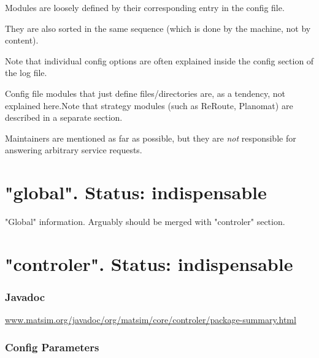 


Modules are loosely defined by their corresponding entry in the config file.

They are also sorted in the same sequence (which is done by the machine, not by content).

Note that individual config options are often explained inside the config section of the log file.

Config file modules that just define files/directories are, as a tendency, not explained here.Note that strategy modules (such as ReRoute, Planomat) are described in a separate section.

Maintainers are mentioned as far as possible, but they are \emph{not} responsible for answering arbitrary service requests.

\umbruch
\section{"global". Status: indispensable}


"Global" information. Arguably should be merged with "controler" section.

\umbruch
\section{"controler". Status: indispensable}


\subsubsection{Javadoc}

\href{http://www.matsim.org/javadoc/org/matsim/core/controler/package-summary.html}{www.matsim.org/javadoc/org/matsim/core/controler/package-summary.html}



\subsubsection{Config Parameters}

